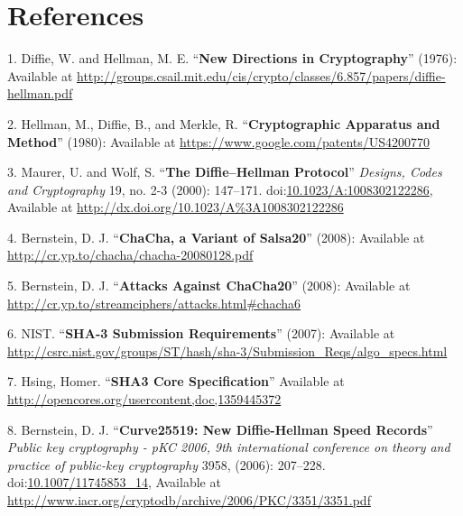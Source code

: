 \section*{References}\label{references}

1. Diffie, W. and Hellman, M. E. ``\textbf{New Directions in
Cryptography}'' (1976): Available at
\url{http://groups.csail.mit.edu/cis/crypto/classes/6.857/papers/diffie-hellman.pdf}

2. Hellman, M., Diffie, B., and Merkle, R. ``\textbf{Cryptographic
Apparatus and Method}'' (1980): Available at
\url{https://www.google.com/patents/US4200770}

3. Maurer, U. and Wolf, S. ``\textbf{The Diffie--Hellman Protocol}''
\emph{Designs, Codes and Cryptography} 19, no. 2-3 (2000): 147--171.
doi:\href{http://dx.doi.org/10.1023/A:1008302122286}{10.1023/A:1008302122286},
Available at \url{http://dx.doi.org/10.1023/A\%3A1008302122286}

4. Bernstein, D. J. ``\textbf{ChaCha, a Variant of Salsa20}'' (2008):
Available at \url{http://cr.yp.to/chacha/chacha-20080128.pdf}

5. Bernstein, D. J. ``\textbf{Attacks Against ChaCha20}'' (2008):
Available at \url{http://cr.yp.to/streamciphers/attacks.html\#chacha6}

6. NIST. ``\textbf{SHA-3 Submission Requirements}'' (2007): Available at
\url{http://csrc.nist.gov/groups/ST/hash/sha-3/Submission_Reqs/algo_specs.html}

7. Hsing, Homer. ``\textbf{SHA3 Core Specification}'' Available at
\url{http://opencores.org/usercontent,doc,1359445372}

8. Bernstein, D. J. ``\textbf{Curve25519: New Diffie-Hellman Speed
Records}'' \emph{Public key cryptography - pKC 2006, 9th international
conference on theory and practice of public-key cryptography} 3958,
(2006): 207--228.
doi:\href{http://dx.doi.org/10.1007/11745853_14}{10.1007/11745853\_14},
Available at
\url{http://www.iacr.org/cryptodb/archive/2006/PKC/3351/3351.pdf} 


